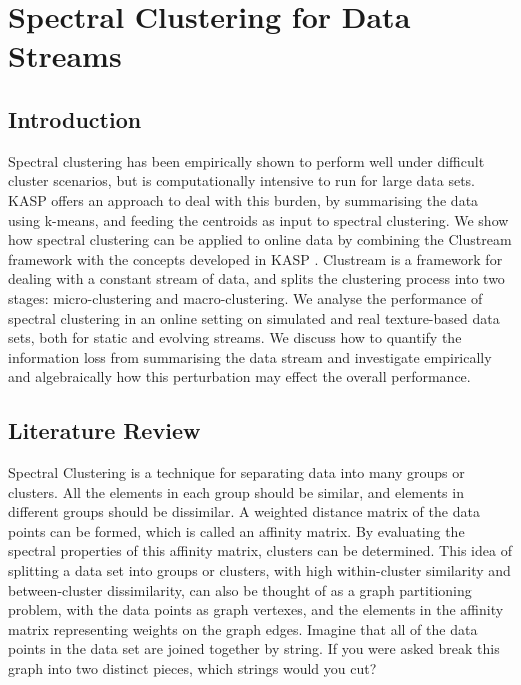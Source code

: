 \documentclass[12pt]{report}		%
\begin{document}

\chapter{Spectral Clustering for Data Streams}


\section{Introduction}

Spectral clustering has been empirically shown to perform well under difficult cluster scenarios, but is computationally intensive to run for large data sets. KASP offers an approach to deal with this burden, by summarising the data using k-means, and feeding the centroids as input to spectral clustering. We show how spectral clustering can be applied to online data by combining the Clustream framework with the concepts developed in KASP \cite{Yan2009}. Clustream is a framework for dealing with a constant stream of data, and splits the clustering process into two stages: micro-clustering and macro-clustering. We analyse the performance of spectral clustering in an online setting on simulated and real texture-based data sets, both for static and evolving streams. We discuss how to quantify the information loss from summarising the data stream and investigate empirically and algebraically how this perturbation may effect the overall performance. 

\section{Literature Review}
\label{sec:spec_lit}


Spectral Clustering is a technique for separating data into many groups or clusters. All the elements in each group should be similar, and elements in different groups should be dissimilar.  A weighted distance matrix of the data points can be formed, which is called an affinity matrix. By evaluating the spectral properties of this affinity matrix, clusters can be determined. This idea of splitting a data set into groups or clusters, with high within-cluster similarity and between-cluster dissimilarity, can also be thought of as a graph partitioning problem, with the data points as graph vertexes, and the elements in the affinity matrix representing weights on the graph edges. Imagine that all of the data points in the data set are joined together by string. If you were asked break this graph into two distinct pieces, which strings would you cut? 
\end{document}
